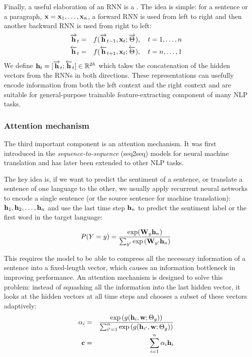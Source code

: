 Finally, a useful elaboration of an RNN is a . The idea is simple: for a sentence or a paragraph, $\mathbf{x} = \mathbf{x}_1, \ldots, \mathbf{x}_n$, a forward RNN is used from left to right and then another backward RNN is used from right to left:
\begin{eqnarray}
    \overrightarrow{\mathbf{h}}_t & = & f(\overrightarrow{\mathbf{h}}_{t-1}, \mathbf{x}_t; \overrightarrow{\Theta}), \quad t = 1, \ldots, n\\
    \overleftarrow{\mathbf{h}}_t & = & f(\overleftarrow{\mathbf{h}}_{t+1}, \mathbf{x}_t; \overleftarrow{\Theta}), \quad t = n, \ldots, 1
\end{eqnarray}
We define $\mathbf{h}_t = [\overrightarrow{\mathbf{h}}_t; \overleftarrow{\mathbf{h}}_t] \in \mathbb{R}^{2h}$ which takes the concatenation of the hidden vectors from the RNNs in both directions. These representations can usefully encode information from both the left context and the right context and are suitable for general-purpose trainable feature-extracting component of many NLP tasks.

\subsubsection*{Attention mechanism}
The third important component is an attention mechanism. It was first introduced in the \textit{sequence-to-sequence} (seq2seq) models \cite{sutskever2014sequence} for neural machine translation \cite{bahdanau2015neural,luong2015effective} and has later been extended to other NLP tasks.

The key idea is, if we want to predict the sentiment of a sentence, or translate a sentence of one language to the other, we usually apply recurrent neural networks to encode a single sentence (or the source sentence for machine translation): $\mathbf{h}_1, \mathbf{h}_2, \ldots, \mathbf{h}_n$ and use the last time step $\mathbf{h}_n$ to predict the sentiment label or the first word in the target language:

\begin{equation}
  P(Y = y) = \frac{\exp(\mathbf{W}_y\mathbf{h}_n)}{\sum_{y'}{\exp\left(\mathbf{W}_{y'}\mathbf{h}_n\right)}}
\end{equation}

This requires the model to be able to compress all the necessary information of a sentence into a fixed-length vector, which causes an information bottleneck in improving performance. An attention mechanism is designed to solve this problem: instead of squashing all the information into the last hidden vector, it looks at the hidden vectors at all time steps and chooses a subset of these vectors adaptively:
\begin{eqnarray}
    \alpha_i & = & \frac{\exp\left(g(\mathbf{h}_i, \mathbf{w}; \Theta_g)\right)}{\sum_{i'=1}^{n}\exp\left(g(\mathbf{h}_{i'}, \mathbf{w}; \Theta_g)\right)} \label{eq:attention} \\
    \mathbf{c} & = & \sum_{i=1}^{n}{\alpha_i \mathbf{h}_i} \label{eq:context-vector}
\end{eqnarray}

